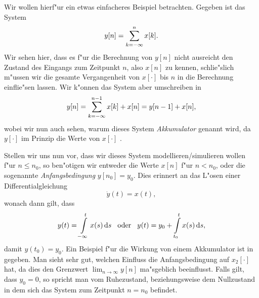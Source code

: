 Wir wollen hierf"ur ein etwas einfacheres Beispiel betrachten. 
Gegeben ist das System
\[
y[n] = {\sum\limits_{k=-\infty}^{n}{x[k]}}.
\]
Wir sehen hier, dass es f"ur die Berechnung von $y[n]$ nicht ausreicht den Zustand des Eingangs zum Zeitpunkt $n$, also $x[n]$ zu kennen, schlie"slich m"ussen wir die gesamte Vergangenheit von $x[\cdot]$ bis $n$ in die Berechnung einflie"sen lassen.
Wir k"onnen das System aber umschreiben in 
\[
y[n] = {\sum\limits_{k=-\infty}^{n-1}{x[k]}} + x[n] = y[n-1] + x[n],
\]
wobei wir nun auch sehen, warum dieses System \emph{Akkumulator} genannt wird, da $y[\cdot]$ im Prinzip die Werte von $x[\cdot]$ .

Stellen wir uns nun vor, dass wir dieses System modellieren/simulieren wollen f"ur $n \leqslant n_0$, so ben"otigen wir entweder die Werte $x[n]$ f"ur $n < n_0$, oder die sogenannte \emph{Anfangsbedingung} $y[n_0] = y_0$.
Dies erinnert an das L"osen einer Differentialgleichung
\[
\dot{y}(t) = x(t),
\]
wonach dann gilt, dass
\[
y(t) = {\int\limits_{-\infty}^{t}{x(s)}\,\mathrm{d}{s}} 
{\hspace{3mm} \text{oder} \hspace{3mm}}
y(t) = y_0 + {\int\limits_{t_0}^{t}{x(s)}\,\mathrm{d}{s}},
\]
damit $y(t_0) = y_0$.
Ein Beispiel f"ur die Wirkung von einem Akkumulator ist in  gegeben. Man sieht sehr gut, welchen Einfluss die Anfangsbedingung auf $x_2[\cdot]$ hat, da dies den Grenzwert $\lim_{n \rightarrow \infty} y[n]$ ma"sgeblich beeinflusst.
Falls gilt, dass $y_0 = 0$, so spricht man vom Ruhezustand, beziehungsweise dem Nullzustand in dem sich das System zum Zeitpunkt $n = n_0$ befindet.
%
